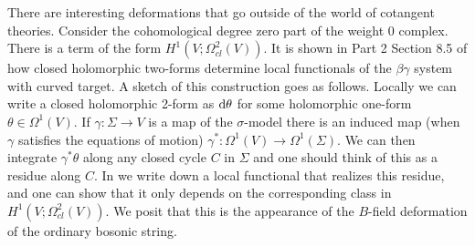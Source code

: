 There are interesting deformations that go outside of the world of cotangent theories. 
Consider the cohomological degree zero part of the weight 0 complex. 
There is a term of the form $H^1(V ; \Omega^2_{cl}(V))$.
It is shown in Part 2 Section 8.5 of \cite{ggw} how closed holomorphic two-forms determine local functionals of the $\beta\gamma$ system with curved target. 
A sketch of this construction goes as follows.
Locally we can write a closed holomorphic 2-form as ${\rm d} \theta$ for some holomorphic one-form $\theta \in \Omega^1(V)$. 
If $\gamma : \Sigma \to V$ is a map of the $\sigma$-model there is an induced map (when $\gamma$ satisfies the equations of motion) $\gamma^* : \Omega^1(V) \to \Omega^1(\Sigma)$. 
We can then integrate $\gamma^* \theta$ along any closed cycle $C$ in $\Sigma$ and one should think of this as a residue along $C$. 
In \cite{ggw} we write down a local functional that realizes this residue, and one can show that it only depends on the corresponding class in $H^1(V ; \Omega^2_{cl}(V))$. 
We posit that this is the appearance of the $B$-field deformation of the ordinary bosonic string. 



